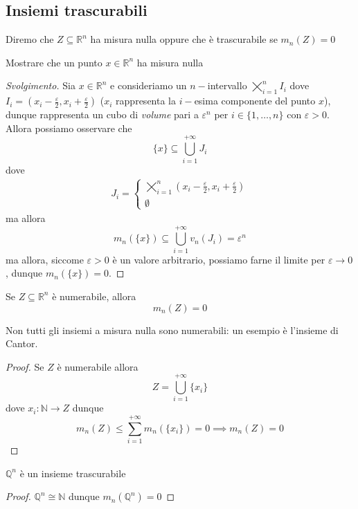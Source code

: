 \subsection{Insiemi trascurabili}
\begin{definition}
	Diremo che $Z \subseteq \mathbb{R}^n$ ha misura nulla oppure che è trascurabile se $m_n(Z) = 0$
\end{definition}
\begin{exercise}
	Mostrare che un punto $x \in \mathbb{R}^n$ ha misura nulla
\end{exercise}
\begin{proof}[Svolgimento]
	Sia $x \in \mathbb{R}^n$ e consideriamo un $n-$intervallo $\varprod\limits_{i=1}^n I_i$ dove $I_i = (x_i - \frac{\varepsilon}{2}, x_i + \frac{\varepsilon}{2})$ ($x_i$ rappresenta la $i-$esima componente del punto $x$), dunque rappresenta un cubo di \emph{volume} pari a $\varepsilon^n$ per $i \in \{1, \ldots, n \}$ con $\varepsilon > 0$. Allora possiamo osservare che
	$$
	\{ x \} \subseteq \bigcup_{i=1}^{+\infty} J_i
	$$
	dove
	\begin{align*}
		J_i = \begin{cases}
			\varprod_{i=1}^n (x_i - \frac{\varepsilon}{2}, x_i + \frac{\varepsilon}{2}) \\
			\emptyset
		\end{cases}
	\end{align*}
	ma allora
	$$
	m_n(\{ x \}) \subseteq \bigcup_{i=1}^{+\infty} v_n(J_i) = \varepsilon^n
	$$
	ma allora, siccome $\varepsilon > 0$ è un valore arbitrario, possiamo farne il limite per $\varepsilon \to 0$, dunque $m_n(\{ x \}) = 0$.
\end{proof}
\begin{prop}
	Se $Z \subseteq \mathbb{R}^n$ è numerabile, allora
	$$
		m_n(Z) = 0
	$$
\end{prop}
\begin{remark}
	Non tutti gli insiemi a misura nulla sono numerabili: un esempio è l'insieme di Cantor.
\end{remark}
\begin{proof}
	Se $Z$ è numerabile allora
	$$
		Z = \bigcup_{i=1}^{+\infty} \{ x_i \}
	$$
	dove $x_i: \mathbb{N} \to Z$ dunque
	$$
	m_n(Z) \leq \sum_{i=1}^{+\infty} m_n(\{ x_i \}) = 0 \implies m_n(Z) = 0
	$$
\end{proof}
\begin{cor}
	$\mathbb{Q}^n$ è un insieme trascurabile
\end{cor}
\begin{proof}
$\mathbb{Q}^n \cong \mathbb{N}$ dunque $m_n(\mathbb{Q}^n) = 0$
\end{proof}
